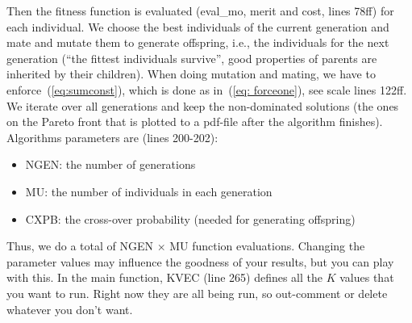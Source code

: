 \documentclass[review]{article}
\begin{document}
Then the fitness function is evaluated (\textsf{eval\_mo}, merit and cost, lines 78ff) for each individual. We choose the best individuals of the current generation and mate and mutate them to generate offspring, i.e., the individuals for the next generation (``the fittest individuals survive'', good properties of parents are inherited by their children). When doing mutation and mating, we have to enforce~(\ref{eq:sumconst}), which is done as in~(\ref{eq: forceone}), see \textsf{scale} lines 122ff. We iterate over all generations and keep the non-dominated solutions (the ones on the Pareto front that is plotted to a pdf-file after the algorithm finishes).\\

Algorithms parameters are (lines 200-202):
\begin{itemize}
\item NGEN: the number of generations
\item MU: the number of individuals in each generation
\item CXPB: the cross-over probability (needed for generating offspring)
\end{itemize}
Thus, we do a total of NGEN $\times$ MU function evaluations. Changing the parameter values may influence the goodness of your results, but you can play with this. In the main function, \textsf{KVEC} (line 265) defines all the $K$ values that you want to run. Right now they are all being run, so out-comment or delete whatever you don't want. 






\end{document}
